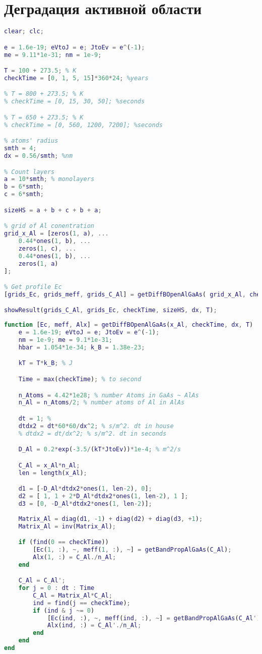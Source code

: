 \chapter{Деградация активной области}
\label{app:Da}
\begin{lstlisting}[style=realcode,language=Matlab,caption={Деградация активной области},label={lst:Da}]
clear; clc;

e = 1.6e-19; eVtoJ = e; JtoEv = e^(-1); 
me = 9.11*1e-31; nm = 1e-9;

T = 100 + 273.5; % K
checkTime = [0, 1, 5, 15]*360*24; %years

% T = 800 + 273.5; % K
% checkTime = [0, 15, 30, 50]; %seconds

% T = 650 + 273.5; % K
% checkTime = [0, 560, 1200, 7200]; %seconds

% atoms' radius
smth = 4;
dx = 0.56/smth; %nm

% Count layers
a = 10*smth; % monolayers
b = 6*smth;
c = 6*smth;

sizeHS = a + b + c + b + a;

% grid of Al conentration
grid_x_Al = [zeros(1, a), ...
	0.44*ones(1, b), ...
	zeros(1, c), ...
	0.44*ones(1, b), ...
	zeros(1, a)
];

% Get profile Ec
[grids_Ec, grids_meff, grids_C_Al] = getDiffBOpenAlGaAs( grid_x_Al, checkTime, dx*nm, T );

showResult(grids_C_Al, grids_Ec, checkTime, sizeHS, dx, T);
\end{lstlisting}

\begin{lstlisting}[style=realcode,language=Matlab,caption={Функция расчета диффузии методом BTCS},label={lst:DaDiff}]
function [Ec, meff, Alx] = getDiffBOpenAlGaAs(x_Al, checkTime, dx, T)
	e = 1.6e-19; eVtoJ = e; JtoEv = e^(-1);
	nm = 1e-9; me = 9.1*1e-31;
	hbar = 1.054*1e-34; k_B = 1.38e-23;

	kT = T*k_B; % J

	Time = max(checkTime); % to second

	n_Atoms = 4.42*1e28; % number Atoms in GaAs ~ AlAs
	n_Al = n_Atoms/2; % number atoms of Al in AlAs

	dt = 1; %
	dtdx2 = dt*60*60/dx^2; % s/m^2. dt in house
	% dtdx2 = dt/dx^2; % s/m^2. dt in seconds

	D_Al = 0.2*exp(-3.5/(kT*JtoEv))*1e-4; % m^2/s

	C_Al = x_Al*n_Al;
	len = length(x_Al);

	d1 = [-D_Al*dtdx2*ones(1, len-2), 0];
	d2 = [ 1, 1 + 2*D_Al*dtdx2*ones(1, len-2), 1 ];
	d3 = [0, -D_Al*dtdx2*ones(1, len-2)];
	
	Matrix_Al = diag(d1, -1) + diag(d2) + diag(d3, +1);
	Matrix_Al = inv(Matrix_Al);

	if (find(0 == checkTime))
		[Ec(1, :), ~, meff(1, :), ~] = getBandPropAlGaAs(C_Al);
		Alx(1, :) = C_Al./n_Al;		
	end

	C_Al = C_Al';
	for j = 0 : dt : Time
		C_Al = Matrix_Al*C_Al;
		ind = find(j == checkTime); 
		if (ind & j ~= 0)
			[Ec(ind, :), ~, meff(ind, :), ~] = getBandPropAlGaAs(C_Al');
			Alx(ind, :) = C_Al'./n_Al;
		end
	end
end
\end{lstlisting}
